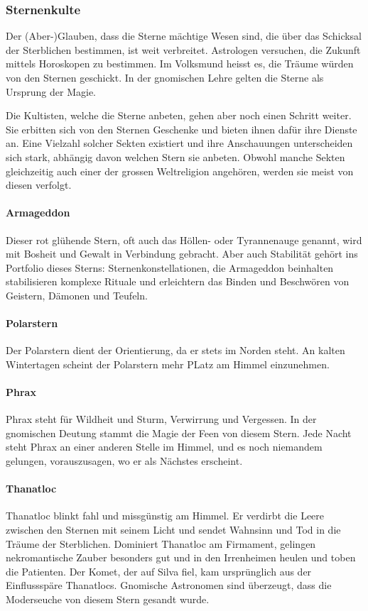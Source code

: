 \documentclass[10pt,twoside,twocolumn,openany]{book}
\begin{document}
	
	\subsubsection{Sternenkulte}
	Der (Aber-)Glauben, dass die Sterne mächtige Wesen sind, die über das Schicksal der Sterblichen bestimmen, ist weit verbreitet. Astrologen versuchen, die Zukunft mittels Horoskopen zu bestimmen. Im Volksmund heisst es, die Träume würden von den Sternen geschickt.
	In der gnomischen Lehre gelten die Sterne als Ursprung der Magie.
	
	Die Kultisten, welche die Sterne anbeten, gehen aber noch einen Schritt weiter. Sie erbitten sich von den Sternen Geschenke und bieten ihnen dafür ihre Dienste an. Eine Vielzahl solcher Sekten existiert und ihre Anschauungen unterscheiden sich stark, abhängig davon welchen Stern sie anbeten. Obwohl manche Sekten gleichzeitig auch einer der grossen Weltreligion angehören, werden sie meist von diesen verfolgt.
	
	\paragraph{Armageddon}
	Dieser rot glühende Stern, oft auch das Höllen- oder Tyrannenauge genannt, wird mit Bosheit und Gewalt in Verbindung gebracht. Aber auch Stabilität gehört ins Portfolio dieses Sterns: Sternenkonstellationen, die Armageddon beinhalten stabilisieren komplexe Rituale und erleichtern das Binden und Beschwören von Geistern, Dämonen und Teufeln.
	
	\paragraph{Polarstern}
	Der Polarstern dient der Orientierung, da er stets im Norden steht. An kalten Wintertagen scheint der Polarstern mehr PLatz am Himmel einzunehmen. 
	
	\paragraph{Phrax}
	Phrax steht für Wildheit und Sturm, Verwirrung und Vergessen. In der gnomischen Deutung stammt die Magie der Feen von diesem Stern. Jede Nacht steht Phrax an einer anderen Stelle im Himmel, und es noch niemandem gelungen, vorauszusagen, wo er als Nächstes erscheint.
	
	\paragraph{Thanatloc}
	Thanatloc blinkt fahl und missgünstig am Himmel. Er verdirbt die Leere zwischen den Sternen mit seinem Licht und sendet Wahnsinn und Tod in die Träume der Sterblichen. Dominiert Thanatloc am Firmament, gelingen nekromantische Zauber besonders gut und in den Irrenheimen heulen und toben die Patienten. Der Komet, der auf Silva fiel, kam ursprünglich aus der Einflussspäre Thanatlocs. Gnomische Astronomen sind überzeugt, dass die Moderseuche von diesem Stern gesandt wurde.
\end{document}
